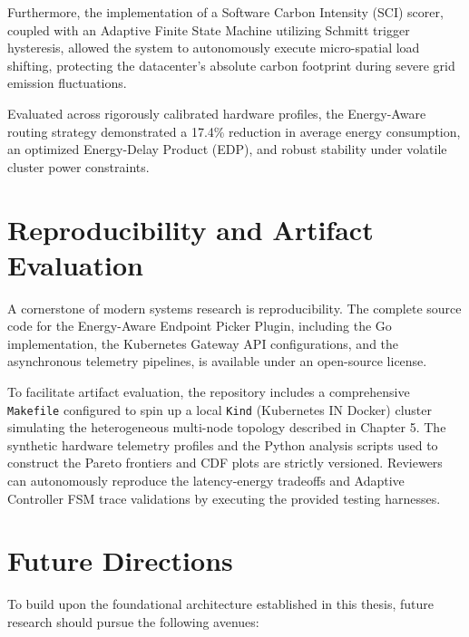 \documentclass[12pt,a4paper,oneside]{report}
\begin{document}
Furthermore, the implementation of a Software Carbon Intensity (SCI) scorer, coupled with an Adaptive Finite State Machine utilizing Schmitt trigger hysteresis, allowed the system to autonomously execute micro-spatial load shifting, protecting the datacenter's absolute carbon footprint during severe grid emission fluctuations. 

Evaluated across rigorously calibrated hardware profiles, the Energy-Aware routing strategy demonstrated a 17.4\% reduction in average energy consumption, an optimized Energy-Delay Product (EDP), and robust stability under volatile cluster power constraints. 

\section{Reproducibility and Artifact Evaluation}
\label{sec:conc_reproducibility}

A cornerstone of modern systems research is reproducibility. The complete source code for the Energy-Aware Endpoint Picker Plugin, including the Go implementation, the Kubernetes Gateway API configurations, and the asynchronous telemetry pipelines, is available under an open-source license. 

To facilitate artifact evaluation, the repository includes a comprehensive \texttt{Makefile} configured to spin up a local \texttt{Kind} (Kubernetes IN Docker) cluster simulating the heterogeneous multi-node topology described in Chapter 5. The synthetic hardware telemetry profiles and the Python analysis scripts used to construct the Pareto frontiers and CDF plots are strictly versioned. Reviewers can autonomously reproduce the latency-energy tradeoffs and Adaptive Controller FSM trace validations by executing the provided testing harnesses.

\section{Future Directions}
\label{sec:conc_future_work}

To build upon the foundational architecture established in this thesis, future research should pursue the following avenues:
\end{document}

